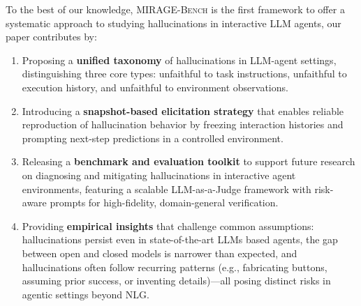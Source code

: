 To the best of our knowledge, \textsc{MIRAGE-Bench} is the first framework to offer a systematic approach to studying hallucinations in interactive LLM agents, our paper contributes by:
\begin{enumerate}[leftmargin=*,topsep=0.5ex,itemsep=-0.5ex,partopsep=0.75ex,parsep=0.75ex,partopsep=0pt,wide,labelindent=0pt]
    \item Proposing a \textbf{unified taxonomy} of hallucinations in LLM-agent settings, distinguishing three core types: unfaithful to task instructions, unfaithful to execution history, and unfaithful to environment observations.
    \item Introducing a \textbf{snapshot-based elicitation strategy} that enables reliable reproduction of hallucination behavior by freezing interaction histories and prompting next-step predictions in a controlled environment.
    \item Releasing a \textbf{benchmark and evaluation toolkit} to support future research on diagnosing and mitigating hallucinations in interactive agent environments, featuring a scalable LLM-as-a-Judge framework with risk-aware prompts for high-fidelity, domain-general verification.
    \item Providing \textbf{empirical insights} that challenge common assumptions: hallucinations persist even in state-of-the-art LLMs based agents, the gap between open and closed models is narrower than expected, and hallucinations often follow recurring patterns (e.g., fabricating buttons, assuming prior success, or inventing details)---all posing distinct risks in agentic settings beyond NLG.
\end{enumerate}